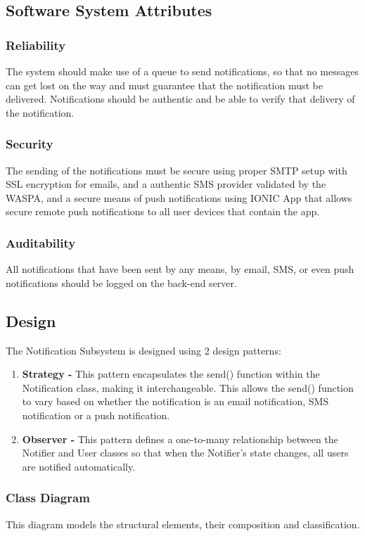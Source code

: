 \subsection{Software System Attributes}
\subsubsection{Reliability}
The system should make use of a queue to send notifications, so that no messages can get lost on the way and must guarantee that the notification must be delivered.
Notifications should be authentic and be able to verify that delivery of the notification.

\subsubsection{Security}
The sending of the notifications must be secure using proper SMTP setup with SSL encryption for emails, and a authentic SMS provider validated by the WASPA, and a secure means of push notifications using IONIC App that allows secure remote push notifications to all user devices that contain the app.

\subsubsection{Auditability}
All notifications that have been sent by any means, by email, SMS, or even push notifications should be logged on the back-end server.


\subsection{Design}
The Notification Subsystem is designed using 2 design patterns:
\begin{enumerate}
	\item \textbf{Strategy - } This pattern encapsulates the send() function within the Notification class, making it interchangeable. This allows the send() function to vary based on whether the notification is an email notification, SMS notification or a push notification.	
	\item \textbf{Observer - } This pattern defines a one-to-many relationship between the Notifier and User classes so that when the Notifier's state changes, all users are notified automatically.
\end{enumerate}
\newpage
\subsubsection{Class Diagram}
This diagram models the structural elements, their composition and classification.

